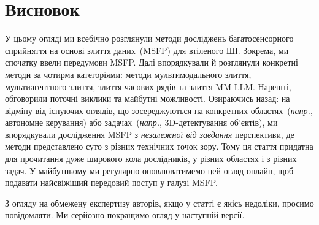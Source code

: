\section{Висновок}
\label{s:conclusion}

У цьому огляді ми всебічно розглянули методи досліджень багатосенсорного сприйняття на основі злиття даних~(MSFP) для втіленого ШІ.
Зокрема, ми спочатку ввели передумови MSFP.
Далі впорядкували й розглянули конкретні методи за чотирма категоріями: методи мультимодального злиття, мультиагентного злиття, злиття часових рядів та злиття MM-LLM.
Нарешті, обговорили поточні виклики та майбутні можливості.
Озираючись назад: на відміну від існуючих оглядів, що зосереджуються на конкретних областях~(\textit{напр.}, автономне керування) або задачах~(\textit{напр.}, 3D-детектування об'єктів), ми впорядкували дослідження MSFP з \emph{незалежної від завдання} перспективи, де методи представлено суто з різних технічних точок зору.
Тому ця стаття придатна для прочитання дуже широкого кола дослідників, у різних областях і з різних задач.
У майбутньому ми регулярно оновлюватимемо цей огляд онлайн, щоб подавати найсвіжіший передовий поступ у галузі MSFP.

З огляду на обмежену експертизу авторів, якщо у статті є якісь недоліки, просимо повідомляти. Ми серйозно покращимо огляд у наступній версії.
